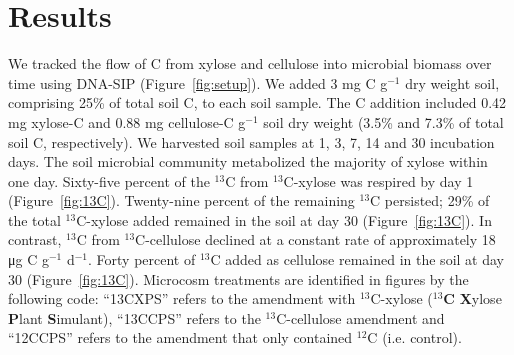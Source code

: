 \section{Results}
We tracked the flow of C from xylose and cellulose into microbial biomass over
time using DNA-SIP (Figure~\ref{fig:setup}). We added 3 mg C g$^{-1}$ dry
weight soil, comprising 25\% of total soil C, to each soil sample. The C
addition included 0.42 mg xylose-C and 0.88 mg cellulose-C g$^{-1}$ soil
dry weight (3.5\% and 7.3\% of total soil C, respectively). We harvested
soil samples at 1, 3, 7, 14 and 30 incubation days. The soil microbial
community metabolized the majority of xylose within one day. Sixty-five percent
of the $^{13}$C from $^{13}$C-xylose was respired by day
1 (Figure~\ref{fig:13C}). Twenty-nine percent of the remaining $^{13}$C
persisted; 29\% of the total $^{13}$C-xylose added remained in the soil at day
30 (Figure~\ref{fig:13C}). In contrast, $^{13}$C from $^{13}$C-cellulose
declined at a constant rate of approximately 18 μg C g$^{-1}$ d$^{-1}$.
Forty percent of $^{13}$C added as cellulose remained in the soil at day 30
(Figure~\ref{fig:13C}). Microcosm treatments are identified in figures by
the following code: ``13CXPS'' refers to the amendment with $^{13}$C-xylose
($^{13}$\textbf{C} \textbf{X}ylose \textbf{P}lant \textbf{S}imulant),
``13CCPS'' refers to the $^{13}$C-cellulose amendment and ``12CCPS'' refers
to the amendment that only contained $^{12}$C (i.e. control).

